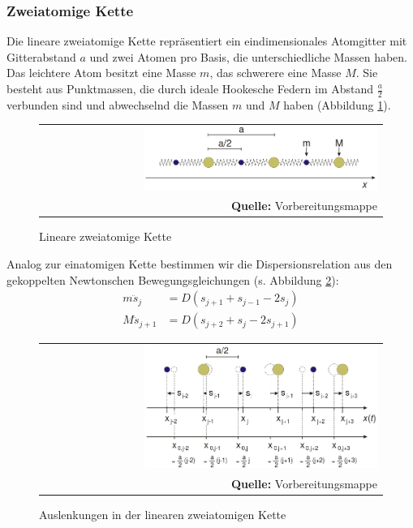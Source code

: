 \documentclass[a4paper,titlepage]{scrartcl}
\numberwithin{equation}{section}
\begin{document}
\subsubsection{Zweiatomige Kette}
Die lineare zweiatomige Kette repräsentiert ein eindimensionales Atomgitter mit Gitterabstand $a$ und zwei Atomen pro Basis, die unterschiedliche Massen haben. Das leichtere Atom besitzt eine Masse $m$, das schwerere eine Masse $M$. Sie besteht aus Punktmassen, die durch ideale Hookesche Federn im Abstand $\frac{a}{2}$ verbunden sind und abwechselnd die Massen $m$ und $M$ haben (Abbildung \ref{fig:zweiatomkette}).
\begin{figure}[H]
	\centering
	\begin{tabular}{@{}r@{}}
		\includegraphics[width=0.7\textwidth]{zweiatomkette.png}\\
		\footnotesize\sffamily\textbf{Quelle:} Vorbereitungsmappe \cite{vorbereitungsmappe}
	\end{tabular}
	\caption{Lineare zweiatomige Kette}
    \label{fig:zweiatomkette}
\end{figure}
Analog zur einatomigen Kette bestimmen wir die Dispersionsrelation aus den gekoppelten Newtonschen Bewegungsgleichungen (s. Abbildung \ref{fig:zweiatomkettekraft}):
\begin{align*}
m \ddot{s}_j&=D(s_{j+1} + s_{j-1} - 2s_j)\\
M \ddot{s}_{j+1}&=D(s_{j+2} + s_j - 2s_{j+1})
\end{align*}
\begin{figure}[H]
	\centering
	\begin{tabular}{@{}r@{}}
		\includegraphics[width=0.7\textwidth]{zweiatomkettekraft.png}\\
		\footnotesize\sffamily\textbf{Quelle:} Vorbereitungsmappe \cite{vorbereitungsmappe}
	\end{tabular}
	\caption{Auslenkungen in der linearen zweiatomigen Kette}
    \label{fig:zweiatomkettekraft}
\end{figure}
\end{document}
